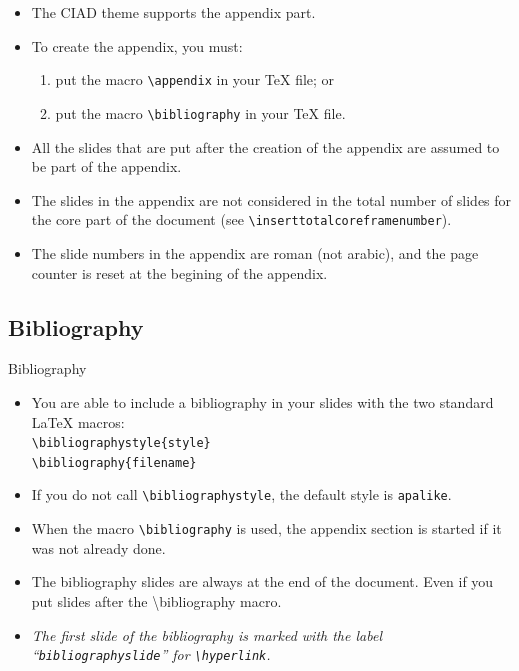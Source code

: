 \documentclass[english,sectioncirclenumberstyle]{ciadbeamer}
\begin{document}
\begin{frame}{\subsecname}
	\begin{itemize}
	\item The CIAD theme supports the appendix part.
	\vspace{1em}
	\item To create the appendix, you must:
		\begin{enumerate}
		\item put the macro \texttt{{\textbackslash}appendix} in your {\TeX} file; or
		\item put the macro \texttt{{\textbackslash}bibliography} in your {\TeX} file.
		\end{enumerate}
	\vspace{1em}
	\item All the slides that are put after the creation of the appendix are assumed to be part of the appendix.
	\item The slides in the appendix are not considered in the total number of slides for the core part of the document (see \texttt{{\textbackslash}inserttotalcoreframenumber}).
	\item The slide numbers in the appendix are roman (not arabic), and the page counter is reset at the begining of the appendix.
	\end{itemize}
\end{frame}

\subsection{Bibliography}

\begin{frame}{Bibliography}
	\begin{itemize}
	\item You are able to include a bibliography in your slides with the two standard {\LaTeX} macros: \\
		\texttt{{\textbackslash}bibliographystyle\{style\}} \\
		\texttt{{\textbackslash}bibliography\{filename\}}
	\vspace{1em}
	\item If you do not call \texttt{{\textbackslash}bibliographystyle}, the default style is \texttt{apalike}.
	\vspace{1em}
	\item When the macro \texttt{{\textbackslash}bibliography} is used, the appendix section is started if it was not already done.
	\item The bibliography slides are \alert{always at the end of the document}. Even if you put slides after the {\textbackslash}bibliography macro.
	\item \emph{The first slide of the bibliography is marked with the label ``\texttt{bibliographyslide}'' for \texttt{{\textbackslash}hyperlink}.}
	\end{itemize}
\end{frame}
\end{document}

